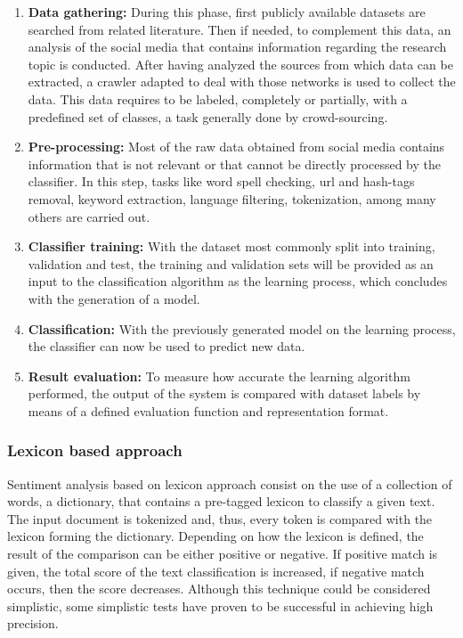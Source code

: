 \begin{enumerate}[label=\textbf{\arabic*}.]
  \item \textbf{Data gathering:} During this phase, first publicly available datasets are searched from related literature. Then if needed, to complement this data, an analysis of the social media that contains information regarding the research topic is conducted. After having analyzed the sources from which data can be extracted, a crawler adapted to deal with those networks is used to collect the data. This data requires to be labeled, completely or partially, with a predefined set of classes, a task generally done by crowd-sourcing.
  \item \textbf{Pre-processing:} Most of the raw data obtained from social media contains information that is not relevant or that cannot be directly processed by the classifier. In this step, tasks like word spell checking, \acrfull{url} and hash-tags removal, keyword extraction, language filtering, tokenization, among many others are carried out.
  \item \textbf{Classifier training:} With the dataset most commonly split into training, validation and test, the training and validation sets will be provided as an input to the classification algorithm as the learning process, which concludes with the generation of a model.
  \item \textbf{Classification:} With the previously generated model on the learning process, the classifier can now be used to predict new data.
  \item \textbf{Result evaluation:} To measure how accurate the learning algorithm performed, the output of the system is compared with dataset labels by means of a defined evaluation function and representation format.
\end{enumerate}

\subsubsection{Lexicon based approach}
\label{subsubsec:techniques_lexicon_based}

Sentiment analysis based on lexicon approach consist on the use of a collection of words, a dictionary, that contains a pre-tagged lexicon to classify a given text. The input document is tokenized and, thus, every token is compared with the lexicon forming the dictionary. Depending on how the lexicon is defined, the result of the comparison can be either positive or negative. If positive match is given, the total score of the text classification is increased, if negative match occurs, then the score decreases. Although this technique could be considered simplistic, some simplistic tests \cite{hatzivassiloglou2000effects} have proven to be successful in achieving high precision. 

